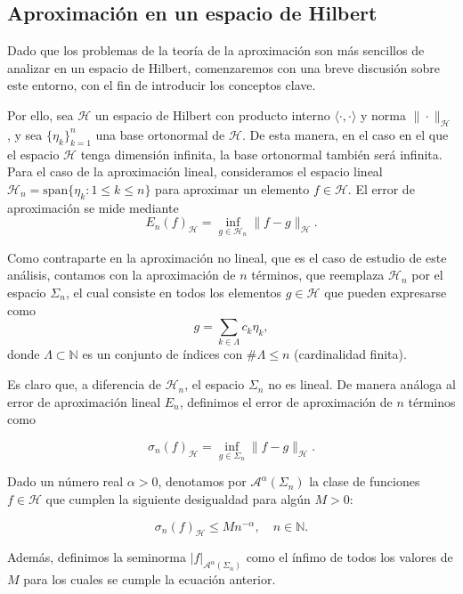 \subsection{Aproximación en un espacio de Hilbert}

Dado que los problemas de la teoría de la aproximación son más sencillos de analizar en un espacio de Hilbert, comenzaremos con una breve discusión sobre este entorno, con el fin de introducir los conceptos clave.

Por ello, sea $\mathcal{H}$ un espacio de Hilbert con producto interno $\langle \cdot, \cdot \rangle$ y norma $\|\cdot\|_{\mathcal{H}}$, y sea $\{\eta_k\}_{k=1}^{n}$ una base ortonormal de $\mathcal{H}$. De esta manera, en el caso en el que el espacio $\mathcal{H}$ tenga dimensión infinita, la base ortonormal también será infinita. Para el caso de la aproximación lineal, consideramos el espacio lineal $\mathcal{H}_n = \text{span}\{\eta_k : 1 \leq k \leq n\}$ para aproximar un elemento $f \in \mathcal{H}$. El error de aproximación se mide mediante
\[
    E_n(f)_{\mathcal{H}} = \inf_{g \in \mathcal{H}_n} \| f - g \|_{\mathcal{H}}.
\]

Como contraparte en la aproximación no lineal, que es el caso de estudio de este análisis, contamos con la aproximación de $n$ términos, que reemplaza $\mathcal{H}_n$ por el espacio $\Sigma_n$, el cual consiste en todos los elementos $g \in \mathcal{H}$ que pueden expresarse como
\[
    g = \sum_{k \in \Lambda} c_k \eta_k,
\]
donde $\Lambda \subset \mathbb{N}$ es un conjunto de índices con $\# \Lambda \leq n$ (cardinalidad finita).

Es claro que, a diferencia de $\mathcal{H}_n$, el espacio $\Sigma_n$ no es lineal. De manera análoga al error de aproximación lineal $E_n$, definimos el error de aproximación de $n$ términos como

\[
    \sigma_n(f)_{\mathcal{H}} = \inf_{g \in \Sigma_n} \| f - g \|_{\mathcal{H}}.
\]

\begin{definicion}
    Dado un número real $\alpha > 0$, denotamos por $\mathcal{A}^{\alpha}(\Sigma_n)$ la clase de funciones $f \in \mathcal{H}$ que cumplen la siguiente desigualdad para algún $M > 0$:

    \begin{equation}\label{eq:clases-error}
        \sigma_n(f)_{\mathcal{H}} \leq M n^{-\alpha}, \quad n \in \mathbb{N}.
    \end{equation}

    Además, definimos la seminorma $|f|_{\mathcal{A}^{\alpha}(\Sigma_n)}$ como el ínfimo de todos los valores de $M$ para los cuales se cumple la ecuación anterior.
\end{definicion}

